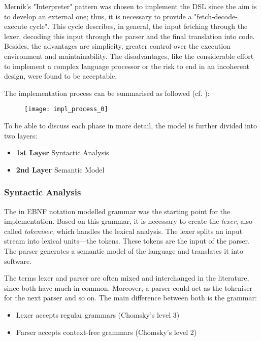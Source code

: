 Mernik's "Interpreter" pattern was chosen to implement the DSL since the aim is to develop an external one; thus, it is necessary to provide a "fetch-decode-execute cycle". This cycle describes, in general, the input fetching through the lexer, decoding this input through the parser and the final translation into code. Besides, the advantages are simplicity, greater control over the execution environment and maintainability. The disadvantages, like the considerable effort to implement a complex language processor or the risk to end in an incoherent design, were found to be acceptable.\cite{Mernik2005}

The implementation process can be summarised as followed (cf. \cite{Ghosh2010}):

\begin{figure}[h]
\centering
\texttt{[image: impl\_process\_0]}
\end{figure}

To be able to discuss each phase in more detail, the model is further divided into two layers:

\begin{itemize}
\item\textbf{1st Layer} Syntactic Analysis
\item\textbf{2nd Layer} Semantic Model
\end{itemize}

\subsubsection{Syntactic Analysis}
\label{IMPL_SCALALA_IMPL_SYNTACTIC}
The in EBNF notation modelled grammar was the starting point for the implementation. Based on this grammar, it is necessary to create the \textit{lexer}, also called \textit{tokeniser}, which handles the lexical analysis. The lexer splits an input stream into lexical units—the tokens. These tokens are the input of the parser. The parser generates a semantic model of the language and translates it into software.

The terms lexer and parser are often mixed and interchanged in the literature, since both have much in common. Moreover, a parser could act as the tokeniser for the next parser and so on. The main difference between both is the grammar:

\begin{itemize}
\item Lexer accepts regular grammars (Chomsky's level 3)
\item Parser accepts context-free grammars (Chomsky's level 2)\cite{Wagenknecht2014}
\end{itemize}

